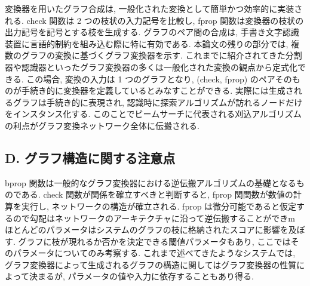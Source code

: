 \documentclass[twocolumn]{jarticle}     %
\begin{document}
変換器を用いたグラフ合成は, 一般化された変換として簡単かつ効率的に実装される. check 関数は 2 つの枝状の入力記号を比較し, fprop 関数は変換器の枝状の出力記号を記号とする枝を生成する. 
グラフのペア間の合成は, 手書き文字認識装置に言語的制約を組み込む際に特に有効である. 
本論文の残りの部分では, 複数のグラフの変換に基づくグラフ変換器を示す. これまでに紹介されてきた分割器や認識器といったグラフ変換器の多くは一般化された変換の観点から定式化できる. 
この場合, 変換の入力は 1 つのグラフとなり, (check, fprop) のペアそのものが手続き的に変換器を定義しているとみなすことができる. 実際には生成されるグラフは手続き的に表現され, 認識時に探索アルゴリズムが訪れるノードだけをインスタンス化する. このことでビームサーチに代表される刈込アルゴリズムの利点がグラフ変換ネットワーク全体に伝搬される.

\subsection*{D. グラフ構造に関する注意点}
bprop 関数は一般的なグラフ変換器における逆伝搬アルゴリズムの基礎となるものである. check 関数が関係を確立すべきと判断すると, fprop 関関数が数値の計算を実行し, ネットワークの構造が確立される. 
fprop は微分可能であると仮定するので勾配はネットワークのアーキテクチャに沿って逆伝搬することができm ほとんどのパラメータはシステムのグラフの枝に格納されたスコアに影響を及ぼす. グラフに枝が現れるか否かを決定できる閾値パラメータもあり, ここではそのパラメータについてのみ考察する. 
これまで述べてきたようなシステムでは, グラフ変換器によって生成されるグラフの構造に関してはグラフ変換器の性質によって決まるが, パラメータの値や入力に依存することもあり得る.
\end{document}
